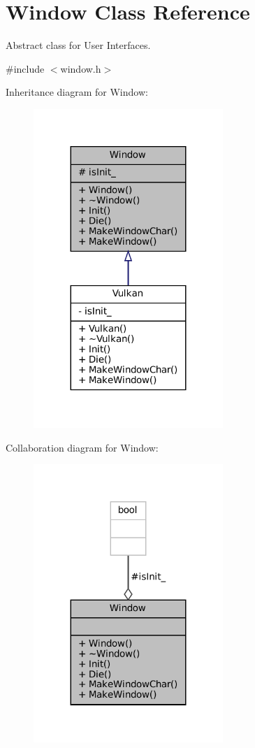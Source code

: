 \hypertarget{classWindow}{}\section{Window Class Reference}
\label{classWindow}


Abstract class for User Interfaces.  




{\ttfamily \#include $<$window.\+h$>$}



Inheritance diagram for Window\+:
\nopagebreak
\begin{figure}[H]
\begin{center}
\leavevmode
\includegraphics[width=203pt]{classWindow__inherit__graph}
\end{center}
\end{figure}


Collaboration diagram for Window\+:
\nopagebreak
\begin{figure}[H]
\begin{center}
\leavevmode
\includegraphics[width=203pt]{classWindow__coll__graph}
\end{center}
\end{figure}

